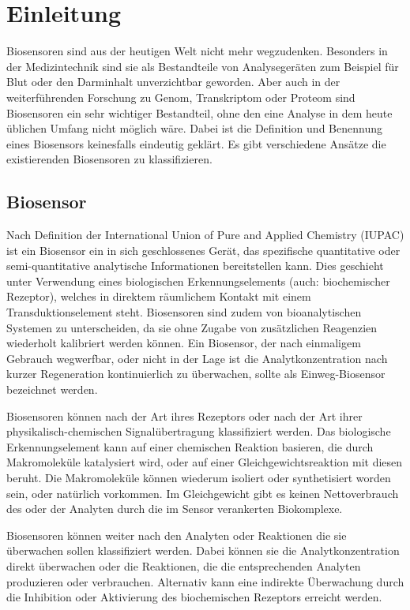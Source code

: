 \chapter{Einleitung}
Biosensoren sind aus der heutigen Welt nicht mehr wegzudenken. Besonders in der Medizintechnik sind sie als Bestandteile von Analysegeräten zum Beispiel für Blut oder den Darminhalt unverzichtbar geworden. Aber auch in der weiterführenden Forschung zu Genom, Transkriptom oder Proteom sind Biosensoren ein sehr wichtiger Bestandteil, ohne den eine Analyse in dem heute üblichen Umfang nicht möglich wäre.
Dabei ist die Definition und Benennung eines Biosensors keinesfalls eindeutig geklärt. Es gibt verschiedene Ansätze die existierenden Biosensoren zu klassifizieren.

\section{Biosensor}
Nach Definition der International Union of Pure and Applied Chemistry (IUPAC) ist ein Biosensor ein in sich geschlossenes Gerät, das spezifische quantitative oder semi-quantitative analytische Informationen bereitstellen kann. Dies geschieht unter Verwendung eines biologischen Erkennungselements (auch: biochemischer Rezeptor), welches in direktem räumlichem Kontakt mit einem Transduktionselement steht. Biosensoren sind zudem von bioanalytischen Systemen zu unterscheiden, da sie ohne Zugabe von zusätzlichen Reagenzien wiederholt kalibriert werden können. Ein Biosensor, der nach einmaligem Gebrauch wegwerfbar, oder nicht in der Lage ist die Analytkonzentration nach kurzer Regeneration kontinuierlich zu überwachen, sollte als Einweg-Biosensor bezeichnet werden.\par
Biosensoren können nach der Art ihres Rezeptors oder nach der Art ihrer physikalisch-chemischen Signalübertragung klassifiziert werden. Das biologische Erkennungselement kann auf einer chemischen Reaktion basieren, die durch Makromoleküle katalysiert wird, oder auf einer Gleichgewichtsreaktion mit diesen beruht. Die Makromoleküle können wiederum isoliert oder synthetisiert worden sein, oder natürlich vorkommen. Im Gleichgewicht gibt es keinen Nettoverbrauch des oder der Analyten durch die im Sensor verankerten Biokomplexe.\par
Biosensoren können weiter nach den Analyten oder Reaktionen die sie überwachen sollen klassifiziert werden. Dabei können sie die Analytkonzentration direkt überwachen oder die Reaktionen, die die entsprechenden Analyten produzieren oder verbrauchen. Alternativ kann eine indirekte Überwachung durch die Inhibition oder Aktivierung des biochemischen Rezeptors erreicht werden.\cite{definitionbiosensors}
